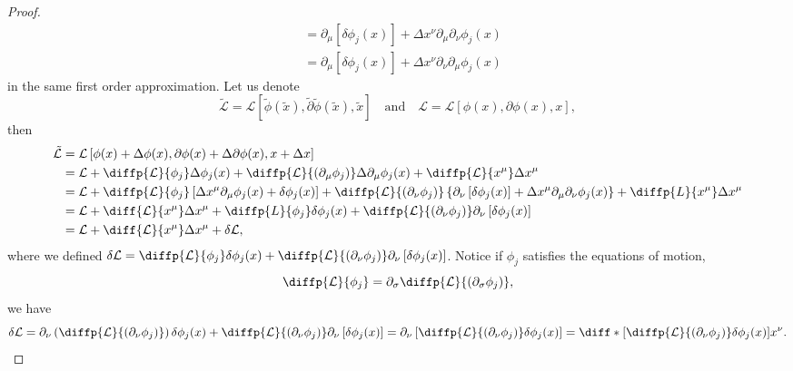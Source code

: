 \documentclass[english]{artigo}
\begin{document}
\begin{proof}
\begin{align*}
         &= \partial_\mu \left[\delta \phi_j(x)\right] + \Delta x^\nu \partial_\mu \partial_\nu \phi_j(x)\\
         &= \partial_\mu \left[\delta \phi_j(x)\right] + \Delta x^\nu \partial_\nu \partial_\mu \phi_j(x)
      \end{align*}
      in the same first order approximation. Let us denote 
      \begin{equation*}
         \tilde{\mathcal{L}} = \mathcal{L}[\tilde{\phi}(\tilde{x}), \tilde{\partial}\tilde{\phi}(\tilde{x}), \tilde{x}]\quad\text{and}\quad
         \mathcal{L} = \mathcal{L}[\phi(x), \partial \phi(x), x], 
      \end{equation*}
      then
      \begin{align*}
         \tilde{\mathcal{L}} &= \mathcal{L}\left[\phi(x) + \Delta \phi(x), \partial \phi(x) + \Delta \partial\phi(x), x + \Delta x\right]\\
                             &= \mathcal{L} + \diffp{\mathcal{L}}{\phi_j} \Delta \phi_j(x) + \diffp{\mathcal{L}}{(\partial_\mu \phi_j)} \Delta \partial_\mu \phi_j(x) + \diffp{\mathcal{L}}{x^\mu} \Delta x^\mu\\
                             &= \mathcal{L} + \diffp{\mathcal{L}}{\phi_j} \left[\Delta x^\mu \partial_\mu \phi_j(x) + \delta\phi_j(x)\right] + 
                             \diffp{\mathcal{L}}{(\partial_\nu \phi_j)} \left\{\partial_\nu \left[\delta \phi_j(x)\right] + \Delta x^\mu \partial_\mu \partial_\nu \phi_j(x)\right\}
                             + \diffp{L}{x^\mu} \Delta x^\mu\\
                             &=  \mathcal{L} + \diff{\mathcal{L}}{x^\mu} \Delta x^\mu + \diffp{L}{\phi_j} \delta \phi_j(x) + \diffp{\mathcal{L}}{(\partial_\nu \phi_j)} \partial_\nu\left[\delta \phi_j(x)\right]\\
                             &=  \mathcal{L} + \diff{\mathcal{L}}{x^\mu} \Delta x^\mu + \delta \mathcal{L},
      \end{align*}
      where we defined \(\delta \mathcal{L} = \diffp{\mathcal{L}}{\phi_j} \delta \phi_j(x) + \diffp{\mathcal{L}}{(\partial_\nu \phi_j)} \partial_\nu\left[\delta \phi_j(x)\right]\). Notice if \(\phi_j\) satisfies the equations of motion,
      \begin{equation*}
         \diffp{\mathcal{L}}{\phi_j} = \partial_\sigma \diffp{\mathcal{L}}{(\partial_\sigma \phi_j)},
      \end{equation*}
      we have
      \begin{equation*}
         \delta \mathcal{L} = \partial_\nu \left(\diffp{\mathcal{L}}{(\partial_\nu \phi_j)}\right) \delta \phi_j(x) + \diffp{\mathcal{L}}{(\partial_\nu \phi_j)} \partial_\nu \left[\delta \phi_j(x)\right] = \partial_\nu\left[\diffp{\mathcal{L}}{(\partial_\nu \phi_j)} \delta\phi_j(x)\right] = \diff*{\left[\diffp{\mathcal{L}}{(\partial_\nu \phi_j)} \delta\phi_j(x)\right]}{x^\nu}.
      \end{equation*}


\end{proof}
\end{document}
